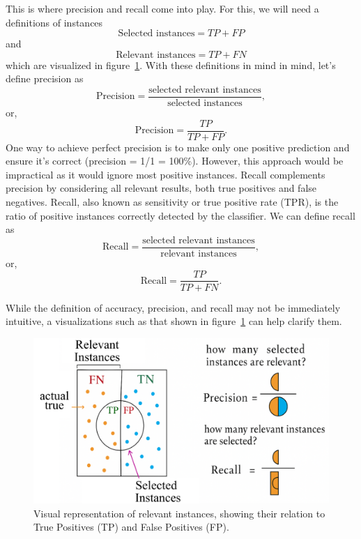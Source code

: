 \documentclass[12pt,letter]{article}
\begin{document}
This is where precision and recall come into play. For this, we will need a definitions of instances
\begin{equation}
\text{Selected instances} = TP + FP
\end{equation}
and
\begin{equation}
\text{Relevant instances} = TP + FN
\end{equation}
which are visualized in figure~\ref{fig:piechart_TP_vs_FP}. With these definitions in mind in mind, let's define precision as
\begin{equation}
\text{Precision} = \frac{\text{selected relevant instances}}{\text{selected instances}},
\end{equation}
or,
\begin{equation}
\text{Precision} = \frac{TP}{TP + FP}.
\end{equation}
One way to achieve perfect precision is to make only one positive prediction and ensure it's correct (precision = 1/1 = 100\%). However, this approach would be impractical as it would ignore most positive instances. Recall complements precision by considering all relevant results, both true positives and false negatives. Recall, also known as sensitivity or true positive rate (TPR), is the ratio of positive instances correctly detected by the classifier. We can define recall as
\begin{equation}
\text{Recall} = \frac{\text{selected relevant instances}}{\text{relevant instances}},
\end{equation}
or,
\begin{equation}
\text{Recall} = \frac{TP}{TP + FN}.
\end{equation}

While the definition of accuracy, precision, and recall may not be immediately intuitive, a visualizations such as that shown in figure~\ref{fig:piechart_TP_vs_FP} can help clarify them.

\begin{figure}[H]
    \centering
    \includegraphics[]{../figures/piechart_TP_vs_FP.png}
    \caption{Visual representation of relevant instances, showing their relation to True Positives (TP) and False Positives (FP). }
    \label{fig:piechart_TP_vs_FP}
\end{figure}
\end{document}
